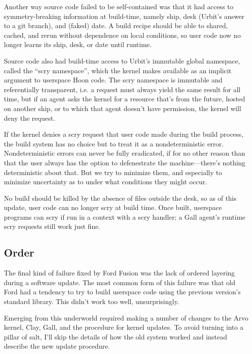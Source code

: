 \documentclass[twoside]{article}
\begin{document}
Another way source code failed to be self-contained was that it had access to symmetry-breaking information at build-time, namely ship, desk (Urbit's answer to a git branch), and (faked) date. A build recipe should be able to shared, cached, and rerun without dependence on local conditions, so user code now no longer learns its ship, desk, or date until runtime.

Source code also had build-time access to Urbit's immutable global namespace, called the “scry namespace”, which the kernel makes available as an implicit argument to userspace Hoon code. The scry namespace is immutable and referentially transparent, i.e. a request must always yield the same result for all time, but if an agent asks the kernel for a resource that’s from the future, hosted on another ship, or to which that agent doesn’t have permission, the kernel will deny the request.

If the kernel denies a scry request that user code made during the build process, the build system has no choice but to treat it as a nondeterministic error. Nondeterministic errors can never be fully eradicated, if for no other reason than that the user always has the option to defenestrate the machine—there's nothing deterministic about that. But we try to minimize them, and especially to minimize uncertainty as to under what conditions they might occur.

No build should be killed by the absence of files outside the desk, so as of this update, user code can no longer scry at build time. Once built, userspace programs can scry if run in a context with a scry handler; a Gall agent's runtime scry requests still work just fine.

\subsection{Order}

The final kind of failure fixed by Ford Fusion was the lack of ordered layering during a software update. The most common form of this failure was that old Ford had a tendency to try to build userspace code using the previous version's standard library. This didn't work too well, unsurprisingly.

Emerging from this underworld required making a number of changes to the Arvo kernel, Clay, Gall, and the procedure for kernel updates. To avoid turning into a pillar of salt, I'll skip the details of how the old system worked and instead describe the new update procedure.
\end{document}
